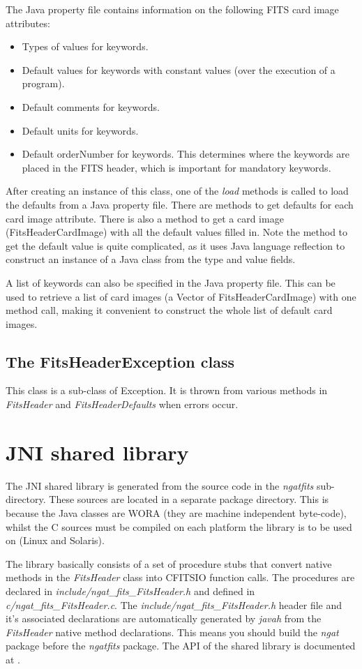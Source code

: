\documentclass[10pt,a4paper]{article}
\begin{document}
The Java property file contains information on the following FITS card image attributes: 
\begin{itemize}
\item Types of values for keywords. 
\item Default values for keywords with constant values (over the execution of a program). 
\item Default comments for keywords. 
\item Default units for keywords. 
\item Default orderNumber for keywords. This determines where the keywords are placed in the FITS header, 
	which is important for mandatory keywords. 
\end{itemize}

After creating an instance of this class, one of the {\em load} methods is called to load the defaults from a 
Java property file. 
There are methods to get defaults for each card image attribute. There is also a method to get a card image
(FitsHeaderCardImage) with all the default values filled in.
Note the method to get the default value is quite complicated, as it
uses Java language reflection to construct an instance of a Java class from the type and value fields.

A list of keywords can also be specified in the Java property file. This can be used to retrieve a list of
card images (a Vector of FitsHeaderCardImage) with one method call, making it convenient to construct the
whole list of default card images.

\subsection{The FitsHeaderException class}
This class is a sub-class of Exception. It is thrown from various methods in {\em FitsHeader} and
{\em FitsHeaderDefaults} when errors occur.

\section{JNI shared library}
The JNI shared library is generated from the source code in the {\em ngatfits} sub-directory. These sources are
located in a separate package directory. This is because the Java classes are WORA (they are machine independent 
byte-code), whilst the C sources must be compiled on each platform the library is to be used on (Linux and Solaris).

The library basically consists of a 
set of procedure stubs that convert native methods in the {\em FitsHeader} class into CFITSIO function calls.
The procedures are declared in {\em include/ngat\_fits\_FitsHeader.h} and defined in {\em c/ngat\_fits\_FitsHeader.c}.
The {\em include/ngat\_fits\_FitsHeader.h} header file and it's associated declarations are automatically 
generated by {\em javah} from the {\em FitsHeader} native method declarations. This means you should build
the {\em ngat} package before the {\em ngatfits} package.
The API of the shared library is documented at \cite{bib:ngatfitsjniapi}.
\end{document}
